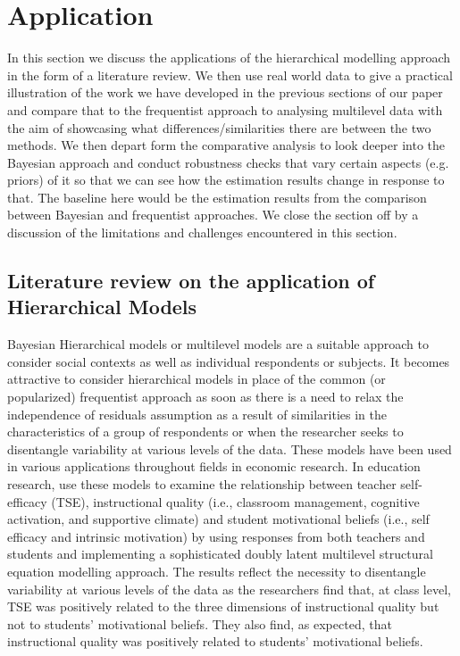 \section{Application}
\label{sec:application}

In this section we discuss the applications of the hierarchical modelling approach in the form of a literature review. We then use real world data to give a practical illustration of the work we have developed in the previous sections of our paper and compare that to the frequentist approach to analysing multilevel data with the aim of showcasing what differences/similarities there are between the two methods. We then depart form the comparative analysis to look deeper into the Bayesian approach and conduct robustness checks that vary certain aspects (e.g. priors) of it so that we can see how the estimation results change in response to that. The baseline here would be the estimation results from the comparison between Bayesian and frequentist approaches. We close the section off by a discussion of the limitations and challenges encountered in this section.


\subsection{Literature review on the application of Hierarchical Models}

Bayesian Hierarchical models or multilevel models are a suitable approach to consider social contexts as well as individual respondents or subjects. It becomes attractive to consider hierarchical models in place of the common (or popularized) frequentist approach as soon as there is a need to relax the independence of residuals assumption as a result of similarities in the characteristics of a group of respondents or when the researcher seeks to disentangle variability at various levels of the data. These models have been used in various applications throughout fields in economic research. In education research, \cite{buric2020teacher} use these models to examine the relationship between teacher self-efficacy (TSE), instructional quality (i.e., classroom management, cognitive activation, and supportive climate) and student motivational beliefs (i.e., self efficacy and intrinsic motivation) by using responses from both teachers and students and implementing a sophisticated doubly latent multilevel structural equation modelling approach. The results reflect the necessity to disentangle variability at various levels of the data as the researchers find that, at class level, TSE was positively related to the three dimensions of instructional quality but not to students' motivational beliefs. They also find, as expected, that instructional quality was positively related to students’ motivational beliefs.

